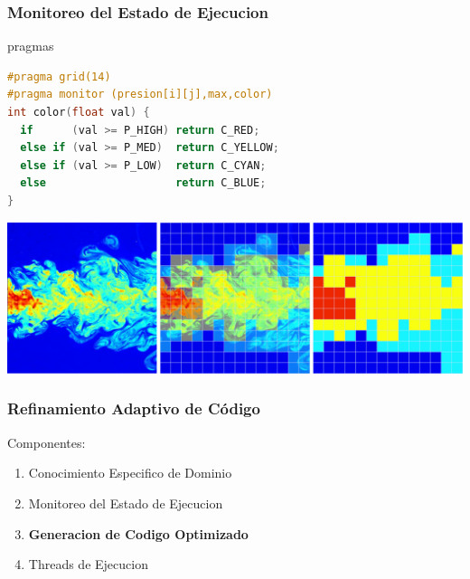\documentclass{beamer}\usetheme{Madrid} %
\begin{document}
\begin{frame}[fragile]
\frametitle{Monitoreo del Estado de Ejecucion}
\begin{block}{pragmas}
\begin{lstlisting}[basicstyle=\scriptsize,language=C]
#pragma grid(14) 
#pragma monitor (presion[i][j],max,color)
int color(float val) {
  if      (val >= P_HIGH) return C_RED; 
  else if (val >= P_MED)  return C_YELLOW;
  else if (val >= P_LOW)  return C_CYAN;
  else                    return C_BLUE;
}
\end{lstlisting}
\end{block}
\begin{center}
\includegraphics[scale=0.20]{img/turbulent_legal.png} \\
\end{center}
\end{frame}
\begin{frame}
\frametitle{Refinamiento Adaptivo de Código}
Componentes:
\begin{enumerate}
\item Conocimiento Especifico de Dominio
\item Monitoreo del Estado de Ejecucion
\item \textbf{Generacion de Codigo Optimizado}
\item Threads de Ejecucion
\end{enumerate}
\end{frame}
\end{document}
